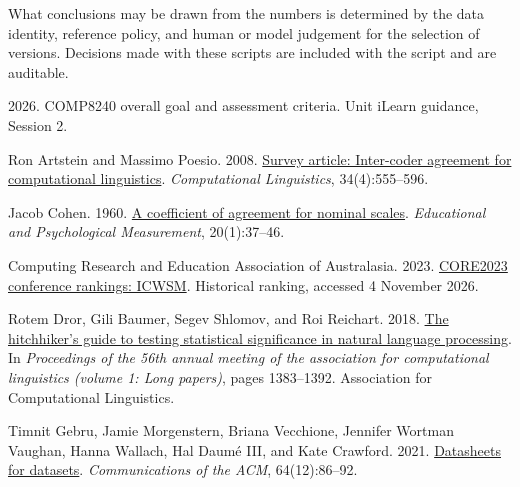 \documentclass[11pt]{article}
\begin{document}
What conclusions may be drawn from the numbers is determined by the data identity, reference policy, and human or model judgement for the selection of versions. Decisions made with these scripts are included with the script and are auditable.


\clearpage
\begin{thebibliography}{}

 \hypertarget{ref_courseCriteria2026}{}2026. COMP8240 overall goal and assessment criteria. Unit iLearn guidance, Session 2.

 \hypertarget{ref_artstein2008agreement}{} Ron Artstein and Massimo Poesio. 2008. \href{https://doi.org/10.1162/coli.07-034-R2}{Survey article: Inter-coder agreement for computational linguistics}. \emph{Computational Linguistics}, 34(4):555--596.

 \hypertarget{ref_cohen1960agreement}{}Jacob Cohen. 1960. \href{https://doi.org/10.1177/001316446002000104}{A coefficient of agreement for nominal scales}. \emph{Educational and Psychological Measurement}, 20(1):37--46.

 \hypertarget{ref_core2023}{}Computing Research and Education Association of Australasia. 2023. \href{https://portal.core.edu.au/conf-ranks/?search=ICWSM\&by=all\&source=CORE2023}{CORE2023 conference rankings: ICWSM}. Historical ranking, accessed 4 November 2026.

 \hypertarget{ref_dror2018significance}{}Rotem Dror, Gili Baumer, Segev Shlomov, and Roi Reichart. 2018. \href{https://doi.org/10.18653/v1/P18-1128}{The hitchhiker's guide to testing statistical significance in natural language processing}. In \emph{Proceedings of the 56th annual meeting of the association for computational linguistics (volume 1: Long papers)}, pages 1383--1392. Association for Computational Linguistics.

 \hypertarget{ref_gebru2021datasheets}{}Timnit Gebru, Jamie Morgenstern, Briana Vecchione, Jennifer Wortman Vaughan, Hanna Wallach, Hal Daumé III, and Kate Crawford. 2021. \href{https://doi.org/10.1145/3458723}{Datasheets for datasets}. \emph{Communications of the ACM}, 64(12):86--92.


\end{thebibliography}
\end{document}
